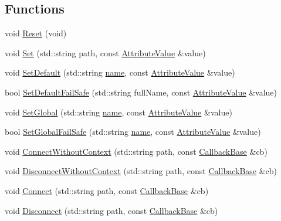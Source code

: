 \subsection*{Functions}
\begin{DoxyCompactItemize}
\item 
void \hyperlink{group__config_ga2c1b65724f42f8c72276d7e7ad6df6db}{Reset} (void)
\item 
void \hyperlink{group__config_gadce03667ec621d64ce4aace85d9bcfd0}{Set} (std\+::string path, const \hyperlink{classns3_1_1AttributeValue}{Attribute\+Value} \&value)
\item 
void \hyperlink{group__config_ga2e7882df849d8ba4aaad31c934c40c06}{Set\+Default} (std\+::string \hyperlink{generate__test__data__lte__spectrum__model_8m_ab74e6bf80237ddc4109968cedc58c151}{name}, const \hyperlink{classns3_1_1AttributeValue}{Attribute\+Value} \&value)
\item 
bool \hyperlink{group__config_ga54361b707f31481b11d19f03495cb045}{Set\+Default\+Fail\+Safe} (std\+::string full\+Name, const \hyperlink{classns3_1_1AttributeValue}{Attribute\+Value} \&value)
\item 
void \hyperlink{group__config_ga0e12663a7bd119b65d0a219a578f2a3c}{Set\+Global} (std\+::string \hyperlink{generate__test__data__lte__spectrum__model_8m_ab74e6bf80237ddc4109968cedc58c151}{name}, const \hyperlink{classns3_1_1AttributeValue}{Attribute\+Value} \&value)
\item 
bool \hyperlink{group__config_gaccae07399fb761a399558a0a03c52dec}{Set\+Global\+Fail\+Safe} (std\+::string \hyperlink{generate__test__data__lte__spectrum__model_8m_ab74e6bf80237ddc4109968cedc58c151}{name}, const \hyperlink{classns3_1_1AttributeValue}{Attribute\+Value} \&value)
\item 
void \hyperlink{group__config_gaa2f896aa7021f95fffabc80b2ec22e08}{Connect\+Without\+Context} (std\+::string path, const \hyperlink{classns3_1_1CallbackBase}{Callback\+Base} \&cb)
\item 
void \hyperlink{group__config_ga9979e293cae542020fada4824d0b3702}{Disconnect\+Without\+Context} (std\+::string path, const \hyperlink{classns3_1_1CallbackBase}{Callback\+Base} \&cb)
\item 
void \hyperlink{group__config_ga4014f151241cd0939b6cb64409605736}{Connect} (std\+::string path, const \hyperlink{classns3_1_1CallbackBase}{Callback\+Base} \&cb)
\item 
void \hyperlink{group__config_ga33e975bd2ed84e3353b2a3356d90fc1d}{Disconnect} (std\+::string path, const \hyperlink{classns3_1_1CallbackBase}{Callback\+Base} \&cb)

\end{DoxyCompactItemize}
